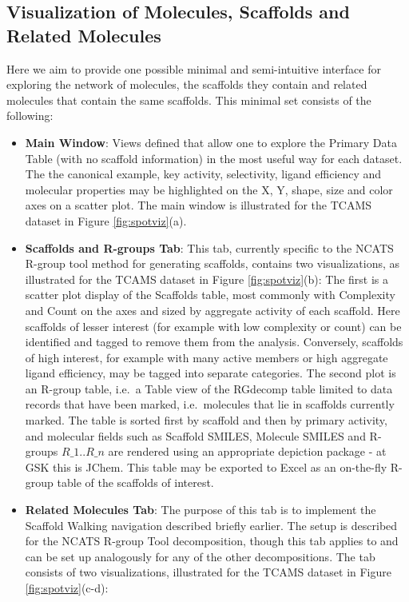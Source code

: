 \documentclass[journal=jacsat,manuscript=article]{achemso}
\newcommand*\fref[1]{Figure \ref{fig:#1}}
\newcommand*\ie{i.e.~}
\begin{document}
\subsection{Visualization of Molecules, Scaffolds and Related Molecules}

Here we aim to provide one possible minimal and semi-intuitive interface for exploring the network of molecules, the scaffolds they contain and related molecules that contain the same scaffolds. This minimal set consists of the following:
\begin{itemize}
\item {\bf Main Window}: Views defined that allow one to explore the Primary Data Table (with no scaffold information) in the most useful way for each dataset.  The the canonical example, key activity, selectivity, ligand efficiency and molecular properties may be highlighted on the X, Y, shape, size and color axes on a scatter plot. The main window is illustrated for the TCAMS dataset in \fref{spotviz}(a).
\item {\bf Scaffolds and R-groups Tab}: This tab, currently specific to the NCATS R-group tool method for generating scaffolds, contains two visualizations, as illustrated for the TCAMS dataset in \fref{spotviz}(b):  
\subitem The first is a scatter plot display of the Scaffolds table, most commonly with Complexity and Count on the axes and sized by aggregate activity of each scaffold.  Here scaffolds of lesser interest (for example with low complexity or count) can be identified and tagged to remove them from the analysis. Conversely, scaffolds of high interest, for example with many active members or high aggregate ligand efficiency, may be tagged into separate categories.
\subitem The second plot is an R-group table, \ie a Table view of the {RG}decomp table limited to data records that have been marked, \ie molecules that lie in scaffolds currently marked. The table is sorted first by scaffold and then by primary activity, and molecular fields such as Scaffold SMILES, Molecule SMILES and R-groups $R\_1..R\_n$ are rendered using an appropriate depiction package - at GSK this is {JChem}.  This table may be exported to Excel as an on-the-fly R-group table of the scaffolds of interest.
\item {\bf Related Molecules Tab}: The purpose of this tab is to implement the Scaffold Walking navigation described briefly earlier.  The setup is described for the NCATS R-group Tool decomposition, though this tab applies to and can be set up analogously for any of the other decompositions. The tab consists of two visualizations, illustrated for the TCAMS dataset in \fref{spotviz}(c-d):

\end{itemize}
\end{document}
